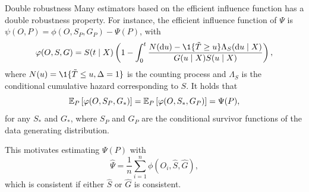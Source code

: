 \documentclass[smaller]{beamer}\usepackage{listings}
\begin{document}
\begin{frame}[label={sec:orgfc992ce}]{Double robustness}
\small Many estimators based on the efficient influence function has a double robustness property.
For instance, the efficient influence function of \(\Psi\) is \(\psi(O, P) = \phi(O, S_P, G_P) -
\Psi(P)\), with
\begin{equation*}
  \phi(O, S, G) = S(t \mid X)
  \left(
    1- \int_0^t \frac{N(\diff u) - \1{\{\tilde T \geq u\}} \Lambda_S(\diff u \mid X)}{G(u \mid X) S(u \mid X)}   
  \right),
\end{equation*}
where \(N(u) = \1{\{\tilde T \leq u, \Delta=1\}}\) is the counting process and $\Lambda_S$ is the
conditional cumulative hazard corresponding to \(S\). It holds that
\begin{equation*}
  \operatorname{\mathbb{E}}_P{\left[ \varphi(O, S_P, G_*) \right]}
  = \operatorname{\mathbb{E}}_P{\left[ \varphi(O, S_*, G_P) \right]}
  = \Psi(P),
\end{equation*}
for any \(S_*\) and \(G_*\), where \(S_P\) and \(G_P\) are the conditional survivor functions of the
data generating distribution.

\vfill

This motivates estimating $\Psi(P)$ with
\begin{equation*}
  \hat \Psi = \frac{1}{n}\sum_{i=1}^{n}\phi(O_i, \hat S, \hat G),
\end{equation*}
which is consistent if either \(\hat S\) or \(\hat G\) is consistent.
\end{frame}
\end{document}

